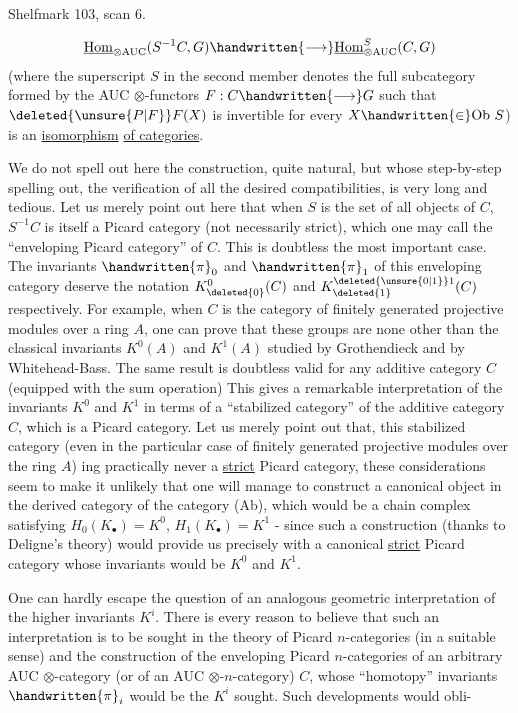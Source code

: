 Shelfmark 103, scan 6.

\[
\underline{\mathrm{Hom}}_{\otimes\mathrm{AUC}}(S^{-1}C,G)\handwritten{\longrightarrow}\underline{\mathrm{Hom}}_{\otimes\mathrm{AUC}}^{S}(C,G)
\]
(where the superscript $S$ in the second member denotes the full subcategory formed by the AUC $\otimes$-functors $F:C\handwritten{\longrightarrow}G$ such that $\deleted{\unsure{P|F}}F(X)$ is invertible for every $X\handwritten{\in}\mathrm{Ob}\ S$) is an \uline{isomorphism} \uline{of categories}.

We do not spell out here the construction, quite natural, but whose step-by-step spelling out,  the verification of all the desired compatibilities, is very long and tedious. Let us merely point out here that when $S$ is the set of all objects of $C$, $S^{-1}C$ is itself a Picard category (not necessarily strict), which one may call the ``enveloping Picard category'' of $C$. This is doubtless the most important case. The invariants $\handwritten{\pi}_{0}$ and $\handwritten{\pi}_{1}$ of this enveloping category deserve the notation $K^{0}_{\deleted{0}}(C)$ and $K^{\deleted{\unsure{0|1}}1}_{\deleted{1}}(C)$ respectively. For example, when $C$ is the category of finitely generated projective modules over a ring $A$,  one can prove that these groups are none other than the classical invariants $K^{0}(A)$ and $K^{1}(A)$ studied by Grothendieck and by Whitehead-Bass. The same result is doubtless valid for any additive category $C$ (equipped with  the sum operation) This gives a remarkable interpretation of the invariants $K^{0}$ and $K^{1}$ in terms of a ``stabilized category'' \handwritten{(}of the additive category $C$\handwritten{)}, which is a Picard category. Let us merely point out that, this stabilized category (even in the particular case of finitely generated projective modules over the ring $A$) ing practically never a \uline{strict} Picard category, these considerations seem to make it unlikely that one will manage to construct a canonical object in the derived category of the category (Ab), which would be a chain complex satisfying $H_{0}(K_{\bullet})=K^{0}$, $H_{1}(K_{\bullet})=K^{1}$ - since such a construction (thanks to Deligne's theory) would provide us precisely with a canonical \uline{strict} Picard category whose invariants would be $K^{0}$ and $K^{1}$.

One can hardly escape the question of an analogous geometric interpretation of the higher invariants $K^{i}$. There is every reason to believe that such an interpretation is to be sought in the theory of Picard $n$-categories (in a suitable sense) and the construction of the enveloping Picard $n$-categories of an arbitrary AUC $\otimes$-category (or of an AUC $\otimes$-$n$-category) $C$, whose ``homotopy'' invariants $\handwritten{\pi}_{i}$ would be the $K^{i}$ sought. Such developments would obli-


